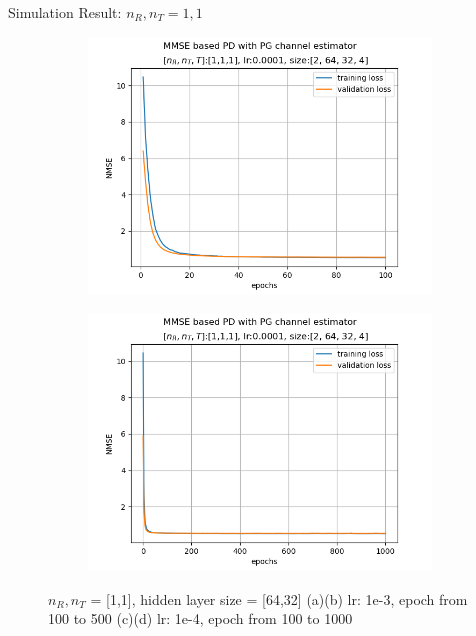 \documentclass[hyperref={bookmarks=false}]{beamer}
\numberwithin{figure}{section}
\begin{document}
\begin{frame}{Simulation Result: $n_R, n_T = 1, 1$}
\begin{figure}[h!]
\begin{subfigure}[b]{0.33\linewidth}
    \end{subfigure}
    \begin{subfigure}[b]{0.33\linewidth}
      \includegraphics[width=\linewidth]{240502/figure_1_0.0001_[2, 64, 32, 4]_ep100.png}
    \end{subfigure}
    \begin{subfigure}[b]{0.33\linewidth}
      \includegraphics[width=\linewidth]{240502/figure_1_0.0001_[2, 64, 32, 4]_ep1000.png}
    \end{subfigure}
    \caption{$n_R, n_T$ = [1,1], hidden layer size = [64,32]
        (a)(b) lr: 1e-3, epoch from 100 to 500
        (c)(d) lr: 1e-4, epoch from 100 to 1000}
  \end{figure}
\end{frame}
\end{document}
